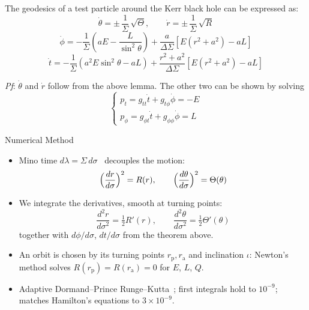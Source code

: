 \documentclass{beamer}
\begin{document}
\begin{frame}{}
    \begin{theorem}
        The geodesics of a test particle around the Kerr black hole can be expressed as:
        \begin{equation}
            \dot{\theta} = \pm\,\frac{1}{\Sigma}\,\sqrt{\Theta},
        \quad\quad
        \dot{r} = \pm\,\frac{1}{\Sigma}\,\sqrt{R}
        \end{equation}
        \begin{equation}
            \dot{\phi} = -\frac{1}{\Sigma}(a E-\frac{L}{\sin^2\theta})+\frac{a}{\Delta\Sigma}[E(r^2+a^2)-aL]
        \end{equation}
        \begin{equation}
            \dot{t} = -\frac{1}{\Sigma}(a^2 E \sin^2\theta-aL) + \frac{r^2+a^2}{\Delta\Sigma}[E(r^2+a^2)-aL]
        \end{equation}
    \end{theorem}
    \textit{Pf}:
    $\dot{\theta}$ and $\dot{r}$ follow from the above lemma. The other two can be shown by solving \begin{equation}
        \begin{cases}
            p_t = g_{tt}\dot{t} +g_{t\phi}\dot{\phi} = -E \\
            p_\phi = g_{\phi t}\dot{t} + g_{\phi\phi}\dot{\phi} = L
        \end{cases}
    \end{equation}
\end{frame}

\begin{frame}{Numerical Method}
  \begin{itemize}
    \item Mino time $d\lambda = \Sigma\, d\sigma$~\cite{mino} decouples the motion:
    \[
    \Bigl(\frac{dr}{d\sigma}\Bigr)^2 = R(r), \qquad \Bigl(\frac{d\theta}{d\sigma}\Bigr)^2 = \Theta(\theta)
    \]
    \item We integrate the derivatives, smooth at turning points:
    \[
    \frac{d^2r}{d\sigma^2} = \tfrac{1}{2}R'(r), \qquad \frac{d^2\theta}{d\sigma^2} = \tfrac{1}{2}\Theta'(\theta)
    \]
    together with $d\phi/d\sigma$, $dt/d\sigma$ from the theorem above.
    \item An orbit is chosen by its turning points $r_{\mathrm{p}}, r_{\mathrm{a}}$ and inclination $\iota$: Newton's method solves $R(r_{\mathrm{p}}) = R(r_{\mathrm{a}}) = 0$ for $E$, $L$, $Q$.
    \item Adaptive Dormand--Prince Runge--Kutta~\cite{hairer}; first integrals hold to $10^{-9}$; matches Hamilton's equations to $3\times 10^{-9}$.
  \end{itemize}
\end{frame}
\end{document}
